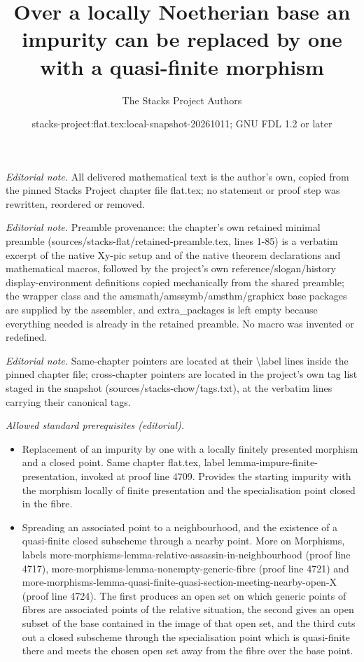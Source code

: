 \documentclass[10pt,a4paper]{amsart}
\title{Over a locally Noetherian base an impurity can be replaced by one with a quasi-finite morphism}
\author{The Stacks Project Authors}
\date{stacks-project:flat.tex:local-snapshot-20261011; GNU FDL 1.2 or later}
\theoremstyle{plain}
\theoremstyle{definition}
\theoremstyle{remark}
\numberwithin{equation}{subsection}
\begin{document}
\maketitle
\noindent\textit{Editorial note.} All delivered mathematical text is the author's own, copied from the pinned Stacks Project chapter file flat.tex; no statement or proof step was rewritten, reordered or removed.\par\medskip
\noindent\textit{Editorial note.} Preamble provenance: the chapter's own retained minimal preamble (sources/stacks-flat/retained-preamble.tex, lines 1-85) is a verbatim excerpt of the native Xy-pic setup and of the native theorem declarations and mathematical macros, followed by the project's own reference/slogan/history display-environment definitions copied mechanically from the shared preamble; the wrapper class and the amsmath/amssymb/amsthm/graphicx base packages are supplied by the assembler, and extra\_packages is left empty because everything needed is already in the retained preamble. No macro was invented or redefined.\par\medskip
\noindent\textit{Editorial note.} Same-chapter pointers are located at their \textbackslash{}label lines inside the pinned chapter file; cross-chapter pointers are located in the project's own tag list staged in the snapshot (sources/stacks-chow/tags.txt), at the verbatim lines carrying their canonical tags.\par\medskip
\noindent\textit{Allowed standard prerequisites (editorial).}\begin{itemize}
\item Replacement of an impurity by one with a locally finitely presented morphism and a closed point. Same chapter flat.tex, label lemma-impure-finite-presentation, invoked at proof line 4709. Provides the starting impurity with the morphism locally of finite presentation and the specialisation point closed in the fibre.
\item Spreading an associated point to a neighbourhood, and the existence of a quasi-finite closed subscheme through a nearby point. More on Morphisms, labels more-morphisms-lemma-relative-assassin-in-neighbourhood (proof line 4717), more-morphisms-lemma-nonempty-generic-fibre (proof line 4721) and more-morphisms-lemma-quasi-finite-quasi-section-meeting-nearby-open-X (proof line 4724). The first produces an open set on which generic points of fibres are associated points of the relative situation, the second gives an open subset of the base contained in the image of that open set, and the third cuts out a closed subscheme through the specialisation point which is quasi-finite there and meets the chosen open set away from the fibre over the base point.
\end{itemize}\medskip
\end{document}
